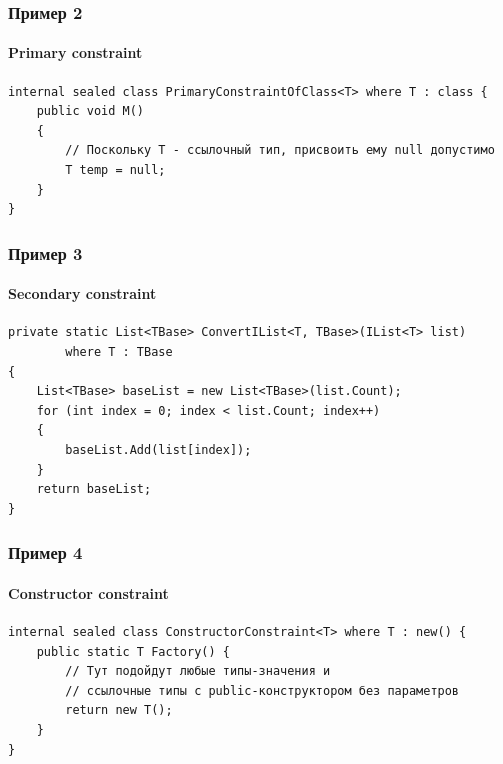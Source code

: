 \documentclass[xetex,mathserif,serif]{beamer}
\begin{document}
	\begin{frame}[fragile]
		\frametitle{Пример 2}
		\framesubtitle{Primary constraint}
		\begin{footnotesize}
			\begin{verbatim}
internal sealed class PrimaryConstraintOfClass<T> where T : class {
    public void M() 
    {
        // Поскольку T - ссылочный тип, присвоить ему null допустимо
        T temp = null;
    }
}
			\end{verbatim}
		\end{footnotesize}
	\end{frame}

	\begin{frame}[fragile]
		\frametitle{Пример 3}
		\framesubtitle{Secondary constraint}
		\begin{footnotesize}
			\begin{verbatim}
private static List<TBase> ConvertIList<T, TBase>(IList<T> list)
        where T : TBase 
{
    List<TBase> baseList = new List<TBase>(list.Count);
    for (int index = 0; index < list.Count; index++) 
    {
        baseList.Add(list[index]);
    }
    return baseList;
}
			\end{verbatim}
		\end{footnotesize}
	\end{frame}

	\begin{frame}[fragile]
		\frametitle{Пример 4}
		\framesubtitle{Constructor constraint}
		\begin{footnotesize}
			\begin{verbatim}
internal sealed class ConstructorConstraint<T> where T : new() {
    public static T Factory() {
        // Тут подойдут любые типы-значения и 
        // ссылочные типы с public-конструктором без параметров
        return new T();
    }
}
			\end{verbatim}
		\end{footnotesize}
	\end{frame}
\end{document}
